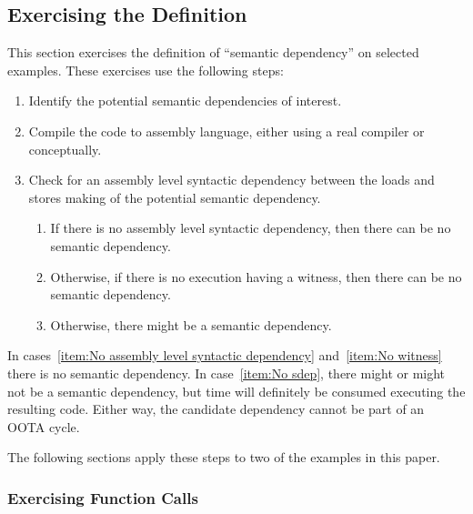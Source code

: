 \subsection{Exercising the Definition}
\label{sec:Exercising the Definition}

This section exercises the definition of ``semantic dependency'' on
selected examples.
These exercises use the following steps:

\begin{enumerate}
\item	Identify the potential semantic dependencies of interest.
\item	Compile the code to assembly language, either using a
	real compiler or conceptually.
\item	Check for an assembly level syntactic dependency between
	the loads and stores making of the potential semantic
	dependency.
	\begin{enumerate}
	\item	If there is no assembly level syntactic dependency,
		then there can be no semantic
		dependency.\label{item:No assembly level syntactic dependency}
	\item	Otherwise, if there is no execution having a witness,
		then there can be no semantic
		dependency.\label{item:No witness}
	\item	Otherwise, there might be a semantic
		dependency.\label{item:No sdep}
	\end{enumerate}
\end{enumerate}

In cases~\ref{item:No assembly level syntactic dependency}
and~\ref{item:No witness}
there is no semantic dependency.
In case~\ref{item:No sdep},
there might or might not be a semantic dependency, but
time will definitely be consumed executing the resulting code.
Either way, the candidate dependency cannot be part of an OOTA
cycle.

The following sections apply these steps to two of the examples in
this paper.

\subsubsection{Exercising Function Calls}
\label{sec:Exercising Function Calls}

